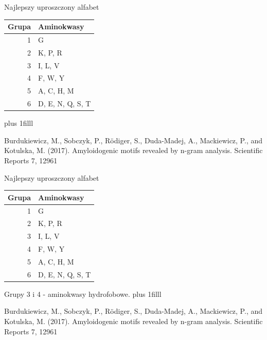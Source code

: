 \documentclass{beamer}\usepackage[]{graphicx}\usepackage[]{color}
\newcommand{\btVFill}{\vskip0pt plus 1filll}
\begin{document}
\begin{frame}{Najlepszy uproszczony alfabet}

   \begin{table}[ht]
\centering
\begin{tabular}{rl}
  \toprule
Grupa & Aminokwasy \\ 
  \midrule
  1 & G \\ 
   \rowcolor[gray]{0.85}  2 & K, P, R \\ 
    3 & I, L, V \\ 
   \rowcolor[gray]{0.85}  4 & F, W, Y \\ 
    5 & A, C, H, M \\ 
   \rowcolor[gray]{0.85}  6 & D, E, N, Q, S, T \\ 
   \bottomrule
\end{tabular}
\end{table}
   \btVFill

\tiny{Burdukiewicz, M., Sobczyk, P., Rödiger, S., Duda-Madej, A., Mackiewicz, P., and Kotulska, M. (2017). Amyloidogenic motifs revealed by n-gram analysis. Scientific Reports 7, 12961}
   \end{frame}

     \begin{frame}{Najlepszy uproszczony alfabet}
   \begin{table}[ht]
\centering
\begin{tabular}{rl}
  \toprule
Grupa & Aminokwasy \\ 
  \midrule
  1 & G \\ 
   \rowcolor[gray]{0.85}  2 & K, P, R \\ 
   \rowcolor{blue!20} 3 & I, L, V \\ 
   \rowcolor{blue!20}  4 & F, W, Y \\ 
    5 & A, C, H, M \\ 
   \rowcolor[gray]{0.85}  6 & D, E, N, Q, S, T \\ 
   \bottomrule
\end{tabular}
\end{table}
   
Grupy 3 i 4 - aminokwasy hydrofobowe.  
\btVFill

\tiny{Burdukiewicz, M., Sobczyk, P., Rödiger, S., Duda-Madej, A., Mackiewicz, P., and Kotulska, M. (2017). Amyloidogenic motifs revealed by n-gram analysis. Scientific Reports 7, 12961}
   \end{frame}
  
\end{document}
